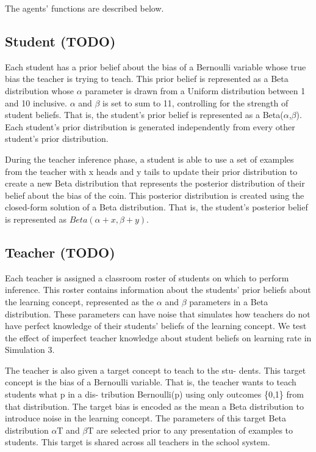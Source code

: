 \documentclass[10pt, letterpaper]{article}
\begin{document}
The agents' functions are described below.

\subsection{Student (TODO)}\label{student-todo}

Each student has a prior belief about the bias of a Bernoulli variable
whose true bias the teacher is trying to teach. This prior belief is
represented as a Beta distribution whose \(\alpha\) parameter is drawn
from a Uniform distribution between 1 and 10 inclusive. \(\alpha\) and
\(\beta\) is set to sum to 11, controlling for the strength of student
beliefs. That is, the student's prior belief is represented as a
Beta(\(\alpha\),\(\beta\)). Each student's prior distribution is
generated independently from every other student's prior distribution.

During the teacher inference phase, a student is able to use a set of
examples from the teacher with x heads and y tails to update their prior
distribution to create a new Beta distribution that represents the
posterior distribution of their belief about the bias of the coin. This
posterior distribution is created using the closed-form solution of a
Beta distribution. That is, the student's posterior belief is
represented as \(Beta(\alpha + x, \beta + y)\).

\subsection{Teacher (TODO)}\label{teacher-todo}

Each teacher is assigned a classroom roster of students on which to
perform inference. This roster contains information about the students'
prior beliefs about the learning concept, represented as the \(\alpha\)
and \(\beta\) parameters in a Beta distribution. These parameters can
have noise that simulates how teachers do not have perfect knowledge of
their students' beliefs of the learning concept. We test the effect of
imperfect teacher knowledge about student beliefs on learning rate in
Simulation 3.

The teacher is also given a target concept to teach to the stu- dents.
This target concept is the bias of a Bernoulli variable. That is, the
teacher wants to teach students what p in a dis- tribution Bernoulli(p)
using only outcomes \{0,1\} from that distribution. The target bias is
encoded as the mean a Beta distribution to introduce noise in the
learning concept. The parameters of this target Beta distribution
\(\alpha\)T and \(\beta\)T are selected prior to any presentation of
examples to students. This target is shared across all teachers in the
school system.
\end{document}
